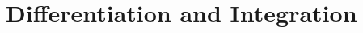 \documentclass[../../main.tex]{subfiles}
\begin{document}
\chapter{Differentiation and Integration}
\end{document}
